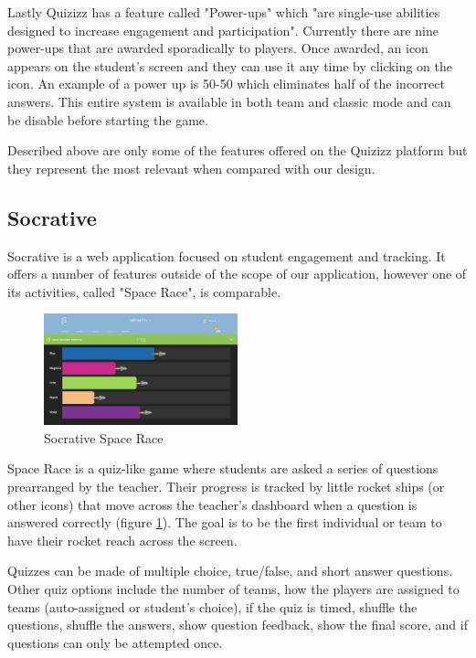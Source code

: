 \documentclass{article}
\begin{document}
Lastly Quizizz has a feature called "Power-ups" which "are single-use abilities designed to increase engagement and participation"\cite{quizizz}. Currently there are nine power-ups that are awarded sporadically to players. Once awarded, an icon appears on the student's screen and they can use it any time by clicking on the icon. An example of a power up is 50-50 which eliminates half of the incorrect answers. This entire system is available in both team and classic mode and can be disable before starting the game.

Described above are only some of the features offered on the Quizizz platform but they represent the most relevant when compared with our design.

\subsection{Socrative}
Socrative is a web application focused on student engagement and tracking. It offers a number of features outside of the scope of our application, however one of its activities, called "Space Race", is comparable.
\begin{figure}
    \centering
    \includegraphics[width=0.5\textwidth]{socrative-space_race}
    \caption{Socrative Space Race \cite{socrative}}
    \label{fig:socrative-space-race}
\end{figure}
Space Race is a quiz-like game where students are asked a series of questions prearranged by the teacher. Their progress is tracked by little rocket ships (or other icons) that move across the teacher's dashboard when a question is answered correctly (figure \ref{fig:socrative-space-race}). The goal is to be the first individual or team to have their rocket reach across the screen.

Quizzes can be made of multiple choice, true/false, and short answer questions. Other quiz options include the number of teams, how the players are assigned to teams (auto-assigned or student's choice), if the quiz is timed, shuffle the questions, shuffle the answers, show question feedback, show the final score, and if questions can only be attempted once.
\end{document}
